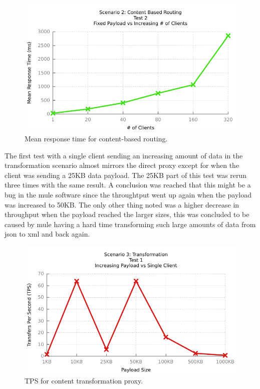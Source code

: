\begin{figure}[H]
	\caption{Mean response time for content-based routing.}
	\centerline{\includegraphics{img/mediation_fp_iu_resp}}
	\label{fig:mediation-2-2}
\end{figure}

The first test with a single client sending an increasing amount of data in the transformation scenario almost mirrors the direct proxy except for when the client was sending a 25KB data payload. The 25KB part of this test was rerun three times with the same result.
A conclusion was reached that this might be a bug in the mule software since the throughtput went up again when the payload was increased to 50KB.
The only other thing noted was a higher decrease in throughput when the payload reached the larger sizes, this was concluded to be caused by mule having a hard time transforming such large amounts of data from json to xml and back again.

\begin{figure}[H]
	\caption{TPS for content transformation proxy.}
	\centerline{\includegraphics{img/transform_fu_ip_tps}}
	\label{fig:transform-1-1}
\end{figure}


